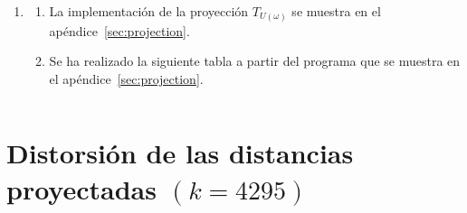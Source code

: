 \begin{enumerate}
\begin{equation*}
{				      {\left\|T_{U}\left(\symbf{x}_{i}\right)-T_{U}\left(\symbf{x}_{j}\right)\right\|}^{2}
			      }{
				      {\left\|\symbf{x}_{i}-\symbf{x}_{j}\right\|}^{2}
			      }-1
			      \right|\geq
			      \varepsilon
			      \right]\leq
		      \sum_{i<j}
		      2\exp\left(-k\frac{\varepsilon^{2}}{4}\right)\leq
		      n^{2}
		      \exp\left(-k\frac{\varepsilon^2}{4}\right).
	      \end{equation*}
	      Sustituyendo el valor de
				$k\geq\frac{48}{\varepsilon^{2}}\log n$ se obtiene
	      \begin{equation*}
		      n^{2}
		      \exp\left(-k\frac{\varepsilon^2}{4}\right)\leq
		      n^{2}
		      \exp\left(-\frac{48\log n}{4}\right)=
		      n^{2}\exp\left(-12\log n\right)=n^{-10}\leq
		      \frac{1}{n}.
	      \end{equation*}
	      Por lo tanto, la probabilidad de que todos los pares
	      preserven sus distancias dentro de un factor
	      $\left(1\pm\varepsilon\right)$ es al menos $1-\frac{1}{n}$.

	\item

	      \begin{enumerate}
		      \item

		            La implementación de la proyección $T_{U\left(\omega\right)}$ se muestra en el apéndice~\ref{sec:projection}.

		      \item

		            Se ha realizado la siguiente tabla a partir del programa que se muestra en el apéndice~\ref{sec:projection}.
		            \begin{listing}[ht!]
			            \tiny
			            \centering
			            \inputminted[frame=single,framesep=10pt]{text}{../python/johnson.txt}
			            \caption{Comparación del error empírico y de la cota teórica de Johnson-Lindenstrauss para diferentes valores de $k$.}
			            \label{lst:results3a}
		            \end{listing}
	      \end{enumerate}
\end{enumerate}

\section{Distorsión de las distancias proyectadas $\left(k=4295\right)$}

